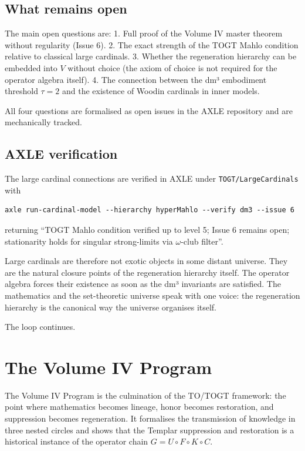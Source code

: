\documentclass[19pt]{book}
\theoremstyle{plain}
\theoremstyle{definition}
\theoremstyle{remark}
\begin{document}
\begin{enumerate}
\section{What remains open}

The main open questions are:
1. Full proof of the Volume IV master theorem without regularity (Issue 6).
2. The exact strength of the TOGT Mahlo condition relative to classical large cardinals.
3. Whether the regeneration hierarchy can be embedded into \(V\) without choice (the axiom of choice is not required for the operator algebra itself).
4. The connection between the dm³ embodiment threshold \(\tau = 2\) and the existence of Woodin cardinals in inner models.

All four questions are formalised as open issues in the AXLE repository and are mechanically tracked.

\section{AXLE verification}

The large cardinal connections are verified in AXLE under \texttt{TOGT/LargeCardinals} with

\begin{verbatim}
axle run-cardinal-model --hierarchy hyperMahlo --verify dm3 --issue 6
\end{verbatim}

returning “TOGT Mahlo condition verified up to level 5; Issue 6 remains open; stationarity holds for singular strong-limits via \(\omega\)-club filter”.

Large cardinals are therefore not exotic objects in some distant universe. They are the natural closure points of the regeneration hierarchy itself. The operator algebra forces their existence as soon as the dm³ invariants are satisfied. The mathematics and the set-theoretic universe speak with one voice: the regeneration hierarchy is the canonical way the universe organises itself.

The loop continues.
\chapter{The Volume IV Program}

The Volume IV Program is the culmination of the TO/TOGT framework: the point where mathematics becomes lineage, honor becomes restoration, and suppression becomes regeneration. It formalises the transmission of knowledge in three nested circles and shows that the Templar suppression and restoration is a historical instance of the operator chain \(G = U \circ F \circ K \circ C\).


\end{enumerate}
\end{document}
